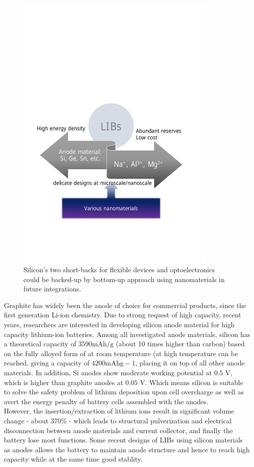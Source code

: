 \begin{figure}  
\centering
\includegraphics[width=280pt]{figures/figure1_lib.pdf}
\caption[Future of optoelectronics and flexible electroncis]{Silicon's two short-backs for flexible devices and optoelectronics could be backed-up by bottom-up approach using nanomaterials in future integrations.
\label{fig:1lib}}
\end{figure}

 Graphite has widely been the anode of choice for commercial products, since the first generation Li-ion chemistry. Due to strong request of high capacity, recent years, researchers are interested in developing silicon anode material for high capacity lithium-ion batteries. Among all investigated anode materials, silicon has a theoretical capacity of $3590 \mathrm{mAh/g}$ (about 10 times higher than carbon) based on the fully alloyed form of  at room temperature (at high temperature  can be reached, giving a capacity of $4200 \mathrm{mAh g−1}$, placing it on top of all other anode materials. In addition, Si anodes show moderate working potential at $0.5$ V, which is higher than graphite anodes at $0.05 $ V. Which means silicon is suitable to solve the safety problem of lithium deposition upon cell overcharge as well as avert the energy penalty of battery cells assembled with the  anodes.\\
 However, the insertion/extraction of lithium ions result in significant volume change - about 370\% - which leads to structural pulverization and electrical disconnection between anode materials and current collector, and finally the battery lose most functions. Some recent designs of LIBs using silicon materials as anodes allows the battery to maintain anode structure and hence to reach high capacity while at the same time good stablity. 
 
